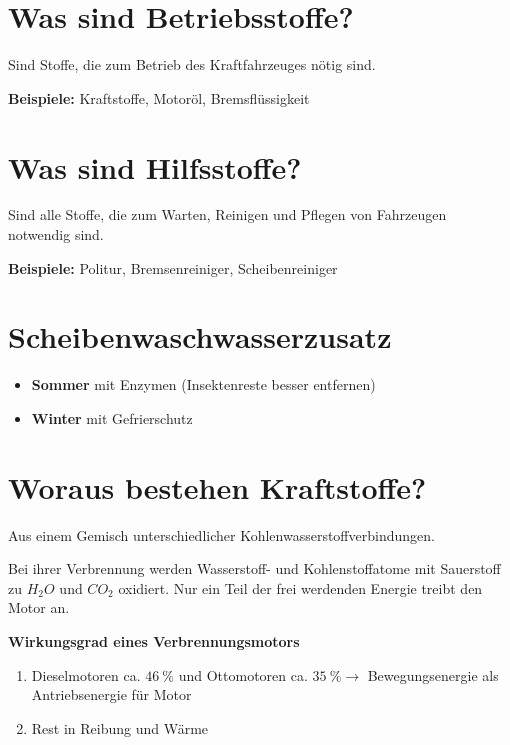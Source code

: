 \section{Was sind Betriebsstoffe?}\label{was-sind-betriebsstoffe}

Sind Stoffe, die zum Betrieb des Kraftfahrzeuges nötig sind.

\textbf{Beispiele:} Kraftstoffe, Motoröl, Bremsflüssigkeit

\section{Was sind Hilfsstoffe?}\label{was-sind-hilfsstoffe}

Sind alle Stoffe, die zum Warten, Reinigen und Pflegen von Fahrzeugen
notwendig sind.

\textbf{Beispiele:} Politur, Bremsenreiniger, Scheibenreiniger

\section{Scheibenwaschwasserzusatz}\label{scheibenwaschwasserzusatz}

\begin{itemize}
\item
  \textbf{Sommer} mit Enzymen (Insektenreste besser entfernen)
\item
  \textbf{Winter} mit Gefrierschutz
\end{itemize}

\section{Woraus bestehen
Kraftstoffe?}\label{woraus-bestehen-kraftstoffe}

Aus einem Gemisch unterschiedlicher Kohlenwasserstoffverbindungen.

Bei ihrer Verbrennung werden Wasserstoff- und Kohlenstoffatome mit
Sauerstoff zu $H_{2}O \text{ und } CO_2$ oxidiert. Nur ein Teil der
frei werdenden Energie treibt den Motor an.

\textbf{Wirkungsgrad eines Verbrennungsmotors}

\begin{enumerate}
\item
  Dieselmotoren ca. $46~\%$ und Ottomotoren ca. $35~\% \to$
  Bewegungsenergie als Antriebsenergie für Motor
\item
  Rest in Reibung und Wärme
\end{enumerate}

